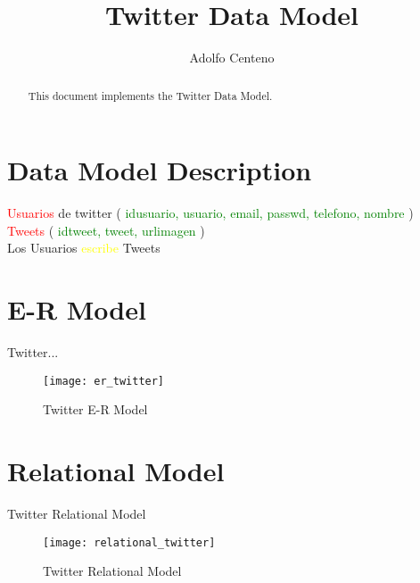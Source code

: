 \documentclass[10pt]{article}         %
\title{Twitter Data Model}
\author{Adolfo Centeno}
\begin{document}
\maketitle

\begin{abstract}
This document implements the Twitter Data Model.
\end{abstract}

\section{Data Model Description}



\textcolor{red}{Usuarios} de twitter (\textcolor{green}{ idusuario, usuario, email, passwd, telefono, nombre } ) \\
\textcolor{red}{Tweets}  (\textcolor{green}{ idtweet, tweet, urlimagen} ) \\

Los Usuarios \textcolor{yellow}{escribe} Tweets 


\section{E-R Model}

Twitter...

\begin{figure}[h]
     \texttt{[image: er\_twitter]}
     \caption{Twitter E-R Model}
\end{figure}
   
\section{Relational Model}
Twitter Relational Model

\begin{figure}[h]
     \texttt{[image: relational\_twitter]}
     \caption{Twitter Relational Model}
\end{figure}
\end{document}
